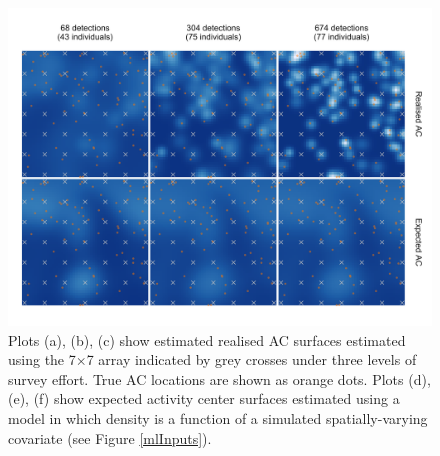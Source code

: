 \documentclass[useAMS,usenatbib,referee]{biom}
\begin{document}
\begin{figure}[htbp]
\centering
\includegraphics[width=1\textwidth]{mona_7x7.png}
\caption{Plots (a), (b), (c) show estimated realised AC surfaces estimated using the 7$\times$7 array indicated by grey crosses under three levels of survey effort. True AC locations are shown as orange dots. Plots (d), (e), (f) show expected activity center surfaces estimated using a model in which density is a function of a simulated spatially-varying covariate (see Figure \ref{mlInputs}).}
\label{mona7x7}
\end{figure}
\end{document}
